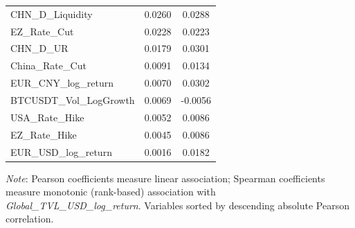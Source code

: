 \begin{tabular}{lcc}
  CHN\_D\_Liquidity & 0.0260 & 0.0288 \\ 
  EZ\_Rate\_Cut & 0.0228 & 0.0223 \\ 
  CHN\_D\_UR & 0.0179 & 0.0301 \\ 
  China\_Rate\_Cut & 0.0091 & 0.0134 \\ 
  EUR\_CNY\_log\_return & 0.0070 & 0.0302 \\ 
  BTCUSDT\_Vol\_LogGrowth & 0.0069 & -0.0056 \\ 
  USA\_Rate\_Hike & 0.0052 & 0.0086 \\ 
  EZ\_Rate\_Hike & 0.0045 & 0.0086 \\ 
  EUR\_USD\_log\_return & 0.0016 & 0.0182 \\ 
  \bottomrule
\end{tabular}
\par\vspace{4pt}
\begin{minipage}{\linewidth}
  \footnotesize \textit{Note}: Pearson coefficients measure linear association; Spearman coefficients measure monotonic (rank-based) association with \textit{Global\_TVL\_USD\_log\_return}. Variables sorted by descending absolute Pearson correlation.
\end{minipage}
